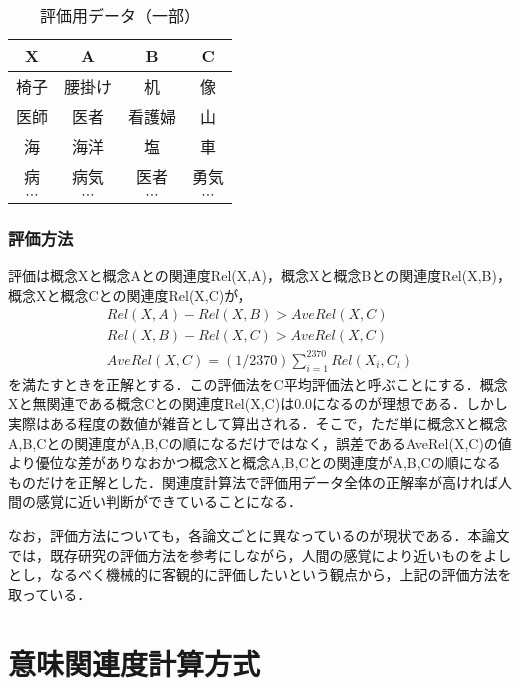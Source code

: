 \begin{table}[tb]
\caption[]{評価用データ（一部）}
\label{T2}
\begin{center}
\begin{tabular}{|c|c|c|c|} \hline
X    & A      & B      & C    \\ \hline\hline
椅子 & 腰掛け & 机     & 像   \\ \hline
医師 & 医者   & 看護婦 & 山   \\ \hline
海   & 海洋   & 塩     & 車   \\ \hline
病   & 病気   & 医者   & 勇気 \\ \hline
$\cdots$ & $\cdots$ & $\cdots$ & $\cdots$ \\ \hline
\end{tabular}
\end{center}
\end{table}

\subsubsection{評価方法}

評価は概念Xと概念Aとの関連度Rel(X,A)，概念Xと概念Bとの関連度Rel(X,B)，概念Xと概念Cとの関連度Rel(X,C)が，
\begin{eqnarray}
Rel(X,A) - Rel(X,B) > AveRel(X,C) \\
Rel(X,B) - Rel(X,C) > AveRel(X,C) \\
AveRel(X,C) = (1/2370) \sum_{i=1}^{2370} Rel(X_i,C_i)
\end{eqnarray}
を満たすときを正解とする．この評価法をC平均評価法と呼ぶことにする．概念Xと無関連である概念Cとの関連度Rel(X,C)は0.0になるのが理想である．しかし実際はある程度の数値が雑音として算出される．そこで，ただ単に概念Xと概念A,B,Cとの関連度がA,B,Cの順になるだけではなく，誤差であるAveRel(X,C)の値より優位な差がありなおかつ概念Xと概念A,B,Cとの関連度がA,B,Cの順になるものだけを正解とした．関連度計算法で評価用データ全体の正解率が高ければ人間の感覚に近い判断ができていることになる．

なお，評価方法についても，各論文ごとに異なっているのが現状である．本論文では，既存研究の評価方法を参考にしながら，人間の感覚により近いものをよしとし，なるべく機械的に客観的に評価したいという観点から，上記の評価方法を取っている．


\section{意味関連度計算方式} \label{S4}


